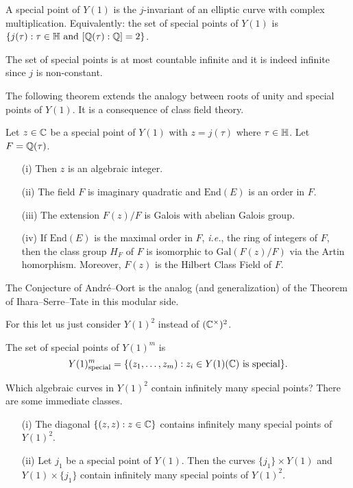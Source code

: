 \begin{definition}
  \label{def:specialY1}
  A special point of $Y(1)$ is the $j$-invariant of an elliptic curve
  with complex multiplication. Equivalently: the set of special points
  of $Y(1)$ is $\{j(\tau) : \tau\in{\mathbb{H}} \text{ and }[{\mathbb{Q}}(\tau):{\mathbb{Q}}]=2\}$. 
\end{definition}

The set of special points is at most countable infinite and it is
indeed infinite since $j$ is non-constant.

The following theorem extends the analogy between roots of unity and
special points of $Y(1)$. It is a consequence of class field theory. 
\begin{theorem}
  \label{thm:galoisspecial}
  Let $z\in {\mathbb{C}}$ be a special point of $Y(1)$ with $z=j(\tau)$ where
  $\tau\in {\mathbb{H}}$. Let $F={\mathbb{Q}}(\tau)$.
  \begin{enumerate}
  \item [(i)] Then $z$ is an algebraic integer.
  \item[(ii)] The field $F$ is
    imaginary quadratic and   $\mathrm{End}(E)$ is an order
    in $F$.
  \item[(iii)] The extension $F(z)/F$ is Galois with abelian Galois
    group.
  \item[(iv)] If $\mathrm{End}(E)$ is the maximal order in $F$,
    \textit{i.e.}, the ring of integers of $F$, then
    the class group $H_F$ of $F$ is isomorphic to
    $\mathrm{Gal}(F(z)/F)$ via the Artin homorphism.
    Moreover, $F(z)$ is the Hilbert Class Field of $F$. 
  \end{enumerate}
\end{theorem}

The Conjecture of Andr\'e--Oort is the analog (and generalization) of
the Theorem of Ihara--Serre--Tate in this modular side.

For this let us just consider $Y(1)^2$ instead of $({\mathbb{C}}^\times)^2$.
\begin{definition}
  \label{def:specialY1m}
  The set of special points of  $Y(1)^m$ is
  $$Y(1)^m_{\mathrm{special}}=\{(z_1,\ldots,z_m) :
  z_i\in Y(1)({\mathbb{C}})\text{ is special} \}.$$
\end{definition}

Which algebraic curves in $Y(1)^2$ contain infinitely many special
points? There are some immediate classes.

\begin{example}
  \begin{enumerate}
  \item[(i)] The diagonal  $\{(z,z) : z\in{\mathbb{C}}\}$ contains infinitely
    many special points of $Y(1)^2$. 
  \item [(ii)]  Let $j_1$ be a special point of $Y(1)$.  Then the curves
    $\{j_1\}\times Y(1)$ and $Y(1)\times \{j_1\}$ contain infinitely many
    special points of $Y(1)^2$. 
  \end{enumerate}
\end{example}

